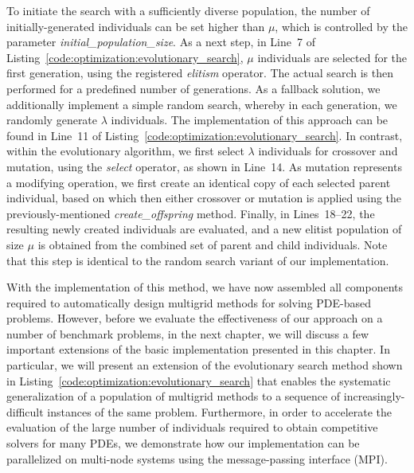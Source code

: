 To initiate the search with a sufficiently diverse population, the number of initially-generated individuals can be set higher than $\mu$, which is controlled by the parameter \emph{initial\_population\_size}.
As a next step, in Line~7 of Listing~\ref{code:optimization:evolutionary_search}, $\mu$ individuals are selected for the first generation, using the registered \emph{elitism} operator.
The actual search is then performed for a predefined number of generations.
As a fallback solution, we additionally implement a simple random search, whereby in each generation, we randomly generate $\lambda$ individuals.
The implementation of this approach can be found in Line~11 of Listing~\ref{code:optimization:evolutionary_search}.
In contrast, within the evolutionary algorithm, we first select $\lambda$ individuals for crossover and mutation, using the \emph{select} operator, as shown in Line~14.
As mutation represents a modifying operation, we first create an identical copy of each selected parent individual, based on which then either crossover or mutation is applied using the previously-mentioned \emph{create\_offspring} method.
Finally, in Lines~18--22, the resulting newly created individuals are evaluated, and a new elitist population of size $\mu$ is obtained from the combined set of parent and child individuals.
Note that this step is identical to the random search variant of our implementation.

With the implementation of this method, we have now assembled all components required to automatically design multigrid methods for solving PDE-based problems.
However, before we evaluate the effectiveness of our approach on a number of benchmark problems, in the next chapter, we will discuss a few important extensions of the basic implementation presented in this chapter.
In particular, we will present an extension of the evolutionary search method shown in Listing~\ref{code:optimization:evolutionary_search} that enables the systematic generalization of a population of multigrid methods to a sequence of increasingly-difficult instances of the same problem.
Furthermore, in order to accelerate the evaluation of the large number of individuals required to obtain competitive solvers for many PDEs, we demonstrate how our implementation can be parallelized on multi-node systems using the message-passing interface (MPI).
